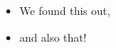 \chapter*{\abstractname}

\Blindtext

\begin{itemize}
    \item We found this out,
    \item and also that!
\end{itemize}
